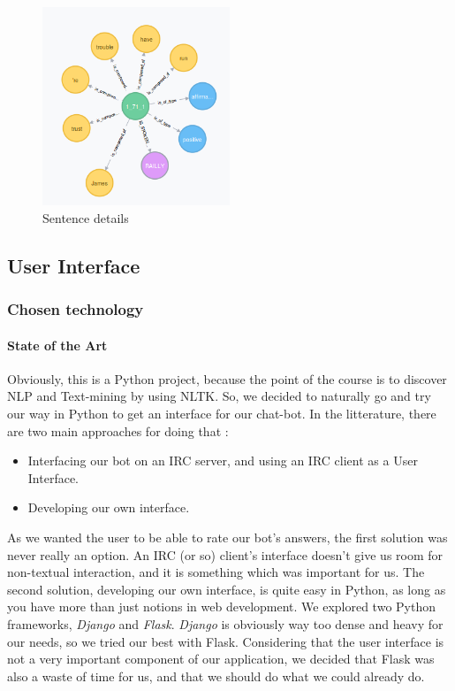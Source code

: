 \begin{figure}[!h]
\begin{center}
\includegraphics[width=0.5\textwidth]{./img/graph1711.png}
\end{center}
\caption{Sentence details}
\label{fig:sent}
\end{figure}

%
\subsection{User Interface}
\subsubsection{Chosen technology}
\label{subs:Technology}

\paragraph{State of the Art}
\label{par:SotA}
Obviously, this is a Python project, because the point of the course is to discover NLP and Text-mining by using NLTK.
So, we decided to naturally go and try our way in Python to get an interface for our chat-bot.
In the litterature, there are two main approaches for doing that :
\begin{itemize}
    \item Interfacing our bot on an IRC server, and using an IRC client as a User Interface.
    \item Developing our own interface.
\end{itemize}
As we wanted the user to be able to rate our bot's answers, the first solution was never really an option.
An IRC (or so) client's interface doesn't give us room for non-textual interaction, and it is something which was important for us.
The second solution, developing our own interface, is quite easy in Python, as long as you have more than just notions in web development.
We explored two Python frameworks, \textit{Django} and \textit{Flask}.
\textit{Django} is obviously way too dense and heavy for our needs, so we tried our best with Flask.
Considering that the user interface is not a very important component of our application, we decided that Flask was also a waste of time for us, and that we should do what we could already do.

